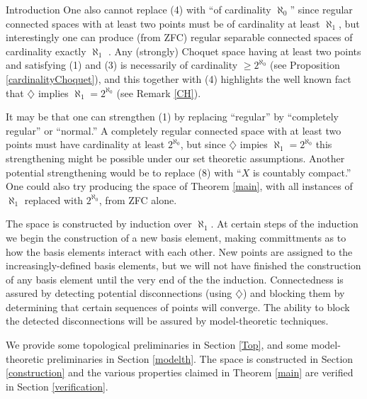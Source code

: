 \documentclass{amsart}
\theoremstyle{definition}\newtheorem{theorem}{Theorem}
\theoremstyle{definition}\newtheorem{bigtheorem}{Theorem}
\numberwithin{theorem}{section}
\theoremstyle{definition}\newtheorem{corollary}[theorem]{Corollary}
\theoremstyle{definition}\newtheorem{proposition}[theorem]{Proposition}
\theoremstyle{definition}\newtheorem{definition}[theorem]{Definition}
\theoremstyle{definition}\newtheorem{question}[theorem]{Question}
\theoremstyle{definition}\newtheorem{example}[theorem]{Example}
\theoremstyle{definition}\newtheorem{remark}[theorem]{Remark}
\theoremstyle{definition}\newtheorem{note}[theorem]{Note}
\theoremstyle{definition}\newtheorem{lemma}[theorem]{Lemma}
\theoremstyle{definition}\newtheorem{fact}[theorem]{Fact}
\theoremstyle{definition}\newtheorem{define}[theorem]{Definition}
\theoremstyle{definition}\newtheorem{definitions}[theorem]{Definitions}
\theoremstyle{definition}\newtheorem{claim}[theorem]{Claim}
\theoremstyle{definition}\newtheorem{obs}[theorem]{Observation}
\theoremstyle{definition}\newtheorem{construction}[theorem]{Construction}
\begin{document}
\begin{section}{Introduction}
One also cannot replace (4) with ``of cardinality $\aleph_0$'' since regular connected spaces with at least two points must be of cardinality at least $\aleph_1$, but interestingly one can produce (from ZFC) regular separable connected spaces of cardinality exactly $\aleph_1$ \cite{CiWo}.  Any (strongly) Choquet space having at least two points and satisfying (1) and (3) is necessarily of cardinality $\geq 2^{\aleph_0}$ (see Proposition \ref{cardinalityChoquet}), and this together with (4) highlights the well known fact that $\diamondsuit$ implies $\aleph_1 = 2^{\aleph_0}$ (see Remark \ref{CH}).

It may be that one can strengthen (1) by replacing ``regular'' by ``completely regular'' or ``normal.''  A completely regular connected space with at least two points must have cardinality at least $2^{\aleph_0}$, but since $\diamondsuit$ impies $\aleph_1 = 2^{\aleph_0}$ this strengthening might be possible under our set theoretic assumptions.  Another potential strengthening would be to replace (8) with ``$X$ is countably compact.''  One could also try producing the space of Theorem \ref{main}, with all instances of $\aleph_1$ replaced with $2^{\aleph_0}$, from ZFC alone.

The space is constructed by induction over $\aleph_1$.  At certain steps of the induction we begin the construction of a new basis element, making committments as to how the basis elements interact with each other.  New points are assigned to the increasingly-defined basis elements, but we will not have finished the construction of any basis element until the very end of the the induction.  Connectedness is assured by detecting potential disconnections (using $\diamondsuit$) and blocking them by determining that certain sequences of points will converge.  The ability to block the detected disconnections will be assured by model-theoretic techniques.

We provide some topological preliminaries in Section \ref{Top}, and some model-theoretic preliminaries in Section \ref{modelth}. The space is constructed in Section \ref{construction} and the various properties claimed in Theorem \ref{main} are verified in Section \ref{verification}.
\end{section}
\end{document}
